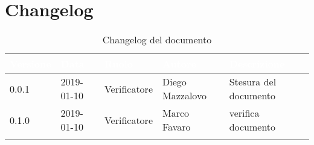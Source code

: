 \newpage

\section{Changelog}

\begin{center}
\begin{longtable}[c]{|m{}|m{}|m{}|m{}|p{}|}
\hline
\rowcolor{bluelogo}\textbf{\textcolor{white}{Versione}} & \textbf{\textcolor{white}{Data}} & \textbf{\textcolor{white}{Ruolo}} & \textbf{\textcolor{white}{Autore}} & \textbf{\textcolor{white}{Descrizione}}\\
\hline 
\endfirsthead
0.0.1 & 2019-01-10 & Verificatore & Diego Mazzalovo & Stesura del documento \\
\hline
\rowcolor{grigio}0.1.0 & 2019-01-10 & Verificatore & Marco Favaro & verifica documento\\
\hline
\caption{Changelog del documento}
\end{longtable}
\end{center}
